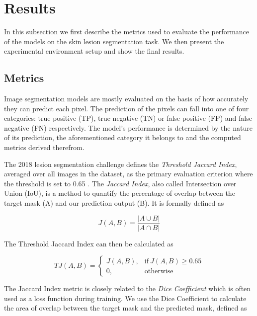 \section{Results}

In this subsection we first describe the metrics used to evaluate the performance of the models on the skin lesion segmentation task. We then present the experimental environment setup and show the final results.

\subsection{Metrics}

Image segmentation models are mostly evaluated on the basis of how accurately they can predict each pixel. The prediction of the pixels can fall into one of four categories: true positive (TP), true negative (TN) or false positive (FP) and false negative (FN) respectively. The model’s performance is determined by the nature of its prediction, the aforementioned category it belongs to and the computed metrics derived therefrom.

The 2018 lesion segmentation challenge defines the \emph{Threshold Jaccard Index}, averaged over all images in the dataset, as the primary evaluation criterion where the threshold is set to 0.65 \citep{challenge-2018-codella}. The \emph{Jaccard Index}, also called Intersection over Union (IoU), is a method to quantify the percentage of overlap between the target mask (A) and our prediction output (B). It is formally defined as

\begin{equation}
  J(A, B) = \frac{|A \cup B|}{|A \cap B|}
\end{equation}

The Threshold Jaccard Index can then be calculated as

\begin{equation}
  TJ(A, B) = \begin{cases}
      J(A, B), & \text{if}\ J(A, B) \geq{0.65} \\
      0, & \text{otherwise}
    \end{cases}
\end{equation}

The Jaccard Index metric is closely related to the \emph{Dice Coefficient} which is often used as a loss function during training. We use the Dice Coefficient to calculate the area of overlap between the target mask and the predicted mask, defined as

